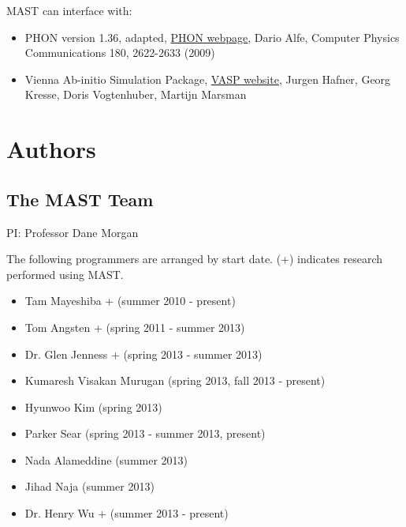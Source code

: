 \documentclass[letterpaper,10pt,english]{sphinxmanual}
\begin{document}
MAST can interface with:
\begin{itemize}
\item {} 
PHON version 1.36, adapted, \href{http://www.homepages.ucl.ac.uk/~ucfbdxa/phon/phon.html}{PHON webpage}, Dario Alfe, Computer Physics Communications 180, 2622-2633 (2009)

\item {} 
Vienna Ab-initio Simulation Package, \href{https://www.vasp.at/}{VASP website}, Jurgen Hafner, Georg Kresse, Doris Vogtenhuber, Martijn Marsman

\end{itemize}


\chapter{Authors}
\label{8_0_personnel::doc}\label{8_0_personnel:authors}

\section{The MAST Team}
\label{8_0_personnel:the-mast-team}
PI: Professor Dane Morgan

The following programmers are arranged by start date. (+) indicates research performed using MAST.
\begin{itemize}
\item {} 
Tam Mayeshiba + (summer 2010 - present)

\item {} 
Tom Angsten + (spring 2011 - summer 2013)

\item {} 
Dr. Glen Jenness + (spring 2013 - summer 2013)

\item {} 
Kumaresh Visakan Murugan (spring 2013, fall 2013 - present)

\item {} 
Hyunwoo Kim (spring 2013)

\item {} 
Parker Sear (spring 2013 - summer 2013, present)

\item {} 
Nada Alameddine (summer 2013)

\item {} 
Jihad Naja (summer 2013)

\item {} 
Dr. Henry Wu + (summer 2013 - present)

\end{itemize}
\end{document}
